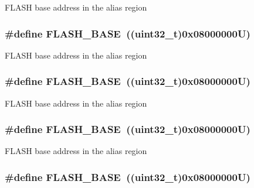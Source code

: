 F\-L\-A\-S\-H base address in the alias region \hypertarget{group___peripheral__memory__map_ga23a9099a5f8fc9c6e253c0eecb2be8db}{
\subsubsection[{F\-L\-A\-S\-H\-\_\-\-B\-A\-S\-E}]{\setlength{\rightskip}{0pt plus 5cm}\#define F\-L\-A\-S\-H\-\_\-\-B\-A\-S\-E~((uint32\-\_\-t)0x08000000\-U)}}\label{group___peripheral__memory__map_ga23a9099a5f8fc9c6e253c0eecb2be8db}
F\-L\-A\-S\-H base address in the alias region \hypertarget{group___peripheral__memory__map_ga23a9099a5f8fc9c6e253c0eecb2be8db}{
\subsubsection[{F\-L\-A\-S\-H\-\_\-\-B\-A\-S\-E}]{\setlength{\rightskip}{0pt plus 5cm}\#define F\-L\-A\-S\-H\-\_\-\-B\-A\-S\-E~((uint32\-\_\-t)0x08000000\-U)}}\label{group___peripheral__memory__map_ga23a9099a5f8fc9c6e253c0eecb2be8db}
F\-L\-A\-S\-H base address in the alias region \hypertarget{group___peripheral__memory__map_ga23a9099a5f8fc9c6e253c0eecb2be8db}{
\subsubsection[{F\-L\-A\-S\-H\-\_\-\-B\-A\-S\-E}]{\setlength{\rightskip}{0pt plus 5cm}\#define F\-L\-A\-S\-H\-\_\-\-B\-A\-S\-E~((uint32\-\_\-t)0x08000000\-U)}}\label{group___peripheral__memory__map_ga23a9099a5f8fc9c6e253c0eecb2be8db}
F\-L\-A\-S\-H base address in the alias region \hypertarget{group___peripheral__memory__map_ga23a9099a5f8fc9c6e253c0eecb2be8db}{
\subsubsection[{F\-L\-A\-S\-H\-\_\-\-B\-A\-S\-E}]{\setlength{\rightskip}{0pt plus 5cm}\#define F\-L\-A\-S\-H\-\_\-\-B\-A\-S\-E~((uint32\-\_\-t)0x08000000\-U)}}\label{group___peripheral__memory__map_ga23a9099a5f8fc9c6e253c0eecb2be8db}
